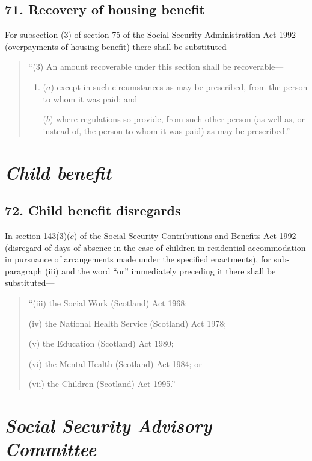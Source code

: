 \documentclass[12pt,a4paper]{article}
\begin{document}
\subsection{71. Recovery of housing benefit}

For subsection (3)  of section 75 of the Social Security Administration Act 1992 (overpayments of housing benefit) there shall be substituted—
\begin{quotation}
“(3) An amount recoverable under this section shall be recoverable—
\begin{enumerate}\item[]
($a$) except in such circumstances as may be prescribed, from the person to whom it was paid; and

($b$) where regulations so provide, from such other person (as well as, or instead of, the person to whom it was paid) as may be prescribed.”
\end{enumerate}
\end{quotation}


\section{\itshape Child benefit}

\subsection{72. Child benefit disregards}

In section 143(3)($c$)  of the Social Security Contributions and Benefits Act 1992 (disregard of days of absence in the case of children in residential accommodation in pursuance of arrangements made under the specified enactments), for sub-paragraph (iii)  and the word “or” immediately preceding it there shall be substituted—
\begin{quotation}
“(iii) the Social Work (Scotland) Act 1968;

(iv) the National Health Service (Scotland) Act 1978;

(v) the Education (Scotland) Act 1980;

(vi) the Mental Health (Scotland) Act 1984; or

(vii) the Children (Scotland) Act 1995.”
\end{quotation}

\section{\itshape Social Security Advisory Committee}
\end{document}
